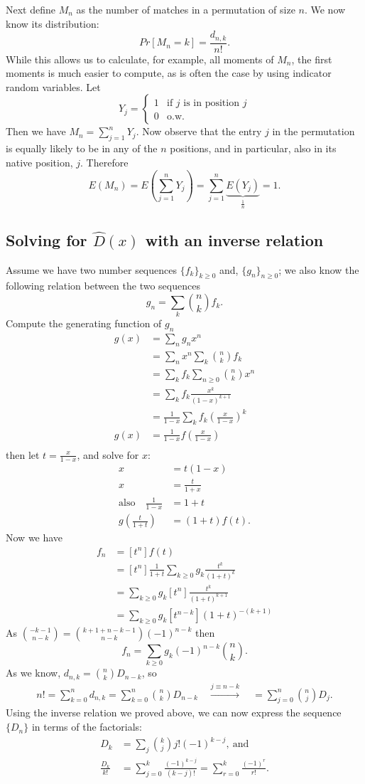 \documentclass[11pt]{article}
\newcommand{\DS}{\displaystyle}
\newcommand{\twopartdef}[4]
{
  \left\{
    \begin{array}{ll}
      #1 & \mbox{if } #2 \\
      #3 & \mbox{} #4 
    \end{array}
  \right.
}
\begin{document}
Next define $M_n$ as the number of matches in a permutation of size $n$.
We now know its distribution:
\[
Pr[M_n=k] = \frac{d_{n,k}}{n!}.
\]
While this allows us to calculate, for example, all moments of $M_n$, the
first moments is much easier to compute, as is often the case by using
indicator random variables.  Let
\[
Y_j=\twopartdef{1}{j\text{ is in position }j}{0}{\text{o.w.}}
\]
Then we have   $M_n =\sum_{j=1}^n Y_j.$
Now observe that the entry $j$ in the permutation is equally likely to be
in any of the $n$ positions, and in particular, also in its native
position, $j$. 
Therefore
\[
E(M_n)=E\left(\sum_{j=1}^nY_j\right)=
\sum_{j=1}^n\underbrace{E(Y_j)}_{\DS\frac{1}{n}}=1.
\]
\subsection{Solving for $\hat D(x)$ with an inverse relation}
Assume we have two number sequences $\{f_k\}_{k\geq 0}$ and, $\{g_n\}_{n\geq
0}$; we also know the following relation between the two sequences
\[
g_n=\sum_k\binom{n}{k}f_k.
\]
Compute the generating function of \(g_n\)
\begin{align*}
g(x)&=\sum_ng_nx^n \\
  &=\sum_nx^n\sum_k\binom{n}{k}f_k \\
  &=\sum_kf_k\sum_{n\geq 0}\binom{n}{k}x^n \\
  &=\sum_kf_k\frac{x^k}{(1-x)^{k+1}} \\
 &=\frac{1}{1-x}\sum_kf_k\left(\frac{x}{1-x}\right)^k\\
  g(x)&=\frac{1}{1-x}f\left(\frac{x}{1-x}\right) \\
\end{align*}
then let \(t=\frac{x}{1-x}\), and solve for $x$:
\begin{align*}
  x&=t(1-x) \\
  x&=\frac{t}{1+x}\\
\text{also}\quad  \frac{1}{1-x}&=1+t\\
  g\left(\frac{t}{1+t}\right)&=(1+t)f(t).
\end{align*}
Now we have
\begin{align*}
  f_n&=[t^n]f(t) \\
  &=[t^n]\frac{1}{1+t}\sum_{k\geq 0}g_k\frac{t^k}{(1+t)^k} \\
  &=\sum_{k\geq 0}g_k[t^n]\frac{t^k}{(1+t)^{k+1}} \\
  &=\sum_{k\geq 0}g_k[t^{n-k}](1+t)^{-(k+1)}
\end{align*}
As \(\binom{-k-1}{n-k}=\binom{k+1+n-k-1}{n-k}(-1)^{n-k}\) then \\
\[
f_n=\sum_{k\geq 0}g_k(-1)^{n-k}\binom{n}{k}.
\]
As we know, \(d_{n,k}=\binom{n}{k}D_{n-k}\), so
\begin{align*}
n! = \sum_{k=0}^nd_{n,k} =\sum_{k=0}^n\binom{n}{k}D_{n-k} \quad
\xrightarrow{j \equiv n-k} \quad =\sum_{j=0}^n\binom{n}{j}D_j.
\end{align*}
Using the inverse relation we proved above, we can now express the
sequence $\{D_n\}$ in terms of the factorials:
\begin{align*}
D_k&=\sum_j\binom{k}{j}j!(-1)^{k-j}, ~\text{and} \\
\frac{D_k}{k!}
&=\sum_{j=0}^k\frac{(-1)^{k-j}}{ (k-j)!}=\sum_{r=0}^k\frac{(-1)^r}{r!}.
\end{align*}
\end{document}
